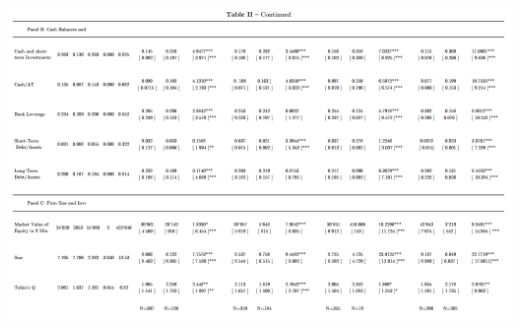 \documentclass[12pt]{article}
\begin{document}
\begin{table}
	\centering
	\begin{adjustbox}{width=\textwidth}
		\includegraphics{Summary}
	\end{adjustbox}
\end{table}

\pagebreak
\end{document}
